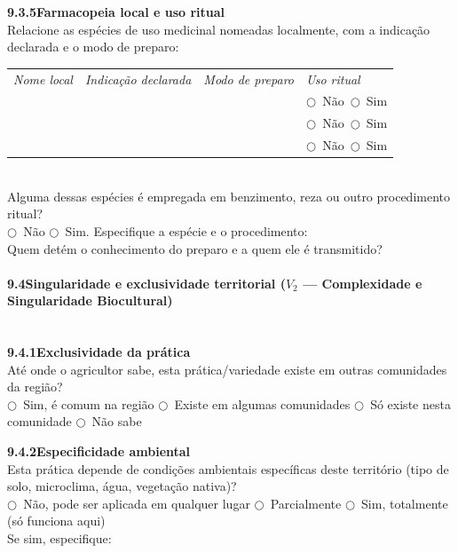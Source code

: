 \medskip\noindent\textbf{9.3.5\quad Farmacopeia local e uso ritual}\\[2pt]
Relacione as espécies de uso medicinal nomeadas localmente, com a indicação declarada e o modo de preparo:\\[2pt]
\begin{tabular}{p{3.6cm}p{3.6cm}p{3.2cm}p{2.4cm}}
\textit{Nome local} & \textit{Indicação declarada} & \textit{Modo de preparo} & \textit{Uso ritual} \\
\dotfill & \dotfill & \dotfill & $\bigcirc$~Não~$\bigcirc$~Sim \\
\dotfill & \dotfill & \dotfill & $\bigcirc$~Não~$\bigcirc$~Sim \\
\dotfill & \dotfill & \dotfill & $\bigcirc$~Não~$\bigcirc$~Sim \\
\end{tabular}\\[4pt]
Alguma dessas espécies é empregada em benzimento, reza ou outro procedimento ritual?\\
$\bigcirc$~Não \quad $\bigcirc$~Sim. Especifique a espécie e o procedimento: \dotfill\\[2pt]
Quem detém o conhecimento do preparo e a quem ele é transmitido? \dotfill

\paragraph{9.4\quad Singularidade e exclusividade territorial ($V_2$ --- Complexidade e Singularidade Biocultural)}~\\[4pt]

\noindent\textbf{9.4.1\quad Exclusividade da prática}\\[2pt]
Até onde o agricultor sabe, esta prática/variedade existe em outras comunidades da região?\\
$\bigcirc$~Sim, é comum na região \quad $\bigcirc$~Existe em algumas comunidades \quad $\bigcirc$~Só existe nesta comunidade \quad $\bigcirc$~Não sabe

\medskip\noindent\textbf{9.4.2\quad Especificidade ambiental}\\[2pt]
Esta prática depende de condições ambientais específicas deste território (tipo de solo, microclima, água, vegetação nativa)?\\
$\bigcirc$~Não, pode ser aplicada em qualquer lugar \quad $\bigcirc$~Parcialmente \quad $\bigcirc$~Sim, totalmente (só funciona aqui)\\[2pt]
Se sim, especifique: \dotfill

